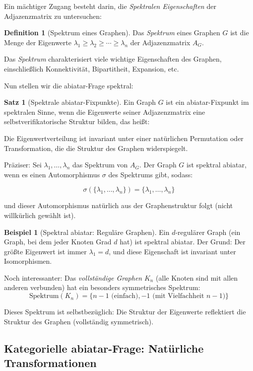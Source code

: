 \documentclass[a4paper,12pt]{article}
\theoremstyle{definition}
\newtheorem{definition}{Definition}
\newtheorem{beispiel}{Beispiel}
\newtheorem{satz}{Satz}
\begin{document}
Ein mächtiger Zugang besteht darin, die \textit{Spektralen Eigenschaften} der Adjazenzmatrix zu untersuchen:

\begin{definition}[Spektrum eines Graphen]
Das \textit{Spektrum} eines Graphen $G$ ist die Menge der Eigenwerte $\lambda_1 \geq \lambda_2 \geq \cdots \geq \lambda_n$ der Adjazenzmatrix $A_G$.

Das \textit{Spektrum} charakterisiert viele wichtige Eigenschaften des Graphen, einschließlich Konnektivität, Bipartitheit, Expansion, etc.
\end{definition}

Nun stellen wir die abiatar-Frage spektral:

\begin{satz}[Spektrale abiatar-Fixpunkte]
Ein Graph $G$ ist ein abiatar-Fixpunkt im spektralen Sinne, wenn die Eigenwerte seiner Adjazenzmatrix eine selbstverifikatorische Struktur bilden, das heißt:

Die Eigenwertverteilung ist invariant unter einer natürlichen Permutation oder Transformation, die die Struktur des Graphen widerspiegelt.

Präziser: Sei $\lambda_1, \ldots, \lambda_n$ das Spektrum von $A_G$. Der Graph $G$ ist spektral abiatar, wenn es einen Automorphismus $\sigma$ des Spektrums gibt, sodass:

$$\sigma(\{\lambda_1, \ldots, \lambda_n\}) = \{\lambda_1, \ldots, \lambda_n\}$$

und dieser Automorphismus natürlich aus der Graphenstruktur folgt (nicht willkürlich gewählt ist).
\end{satz}

\begin{beispiel}[Spektral abiatar: Reguläre Graphen]
Ein $d$-regulärer Graph (ein Graph, bei dem jeder Knoten Grad $d$ hat) ist spektral abiatar. Der Grund: Der größte Eigenwert ist immer $\lambda_1 = d$, und diese Eigenschaft ist invariant unter Isomorphismen.

Noch interessanter: Das \textit{vollständige Graphen} $K_n$ (alle Knoten sind mit allen anderen verbunden) hat ein besonders symmetrisches Spektrum:
$$\text{Spektrum}(K_n) = \{n-1 \text{ (einfach)}, -1 \text{ (mit Vielfachheit } n-1)\}$$

Dieses Spektrum ist selbstbezüglich: Die Struktur der Eigenwerte reflektiert die Struktur des Graphen (vollständig symmetrisch).
\end{beispiel}

\subsection{Kategorielle abiatar-Frage: Natürliche Transformationen}
\end{document}
